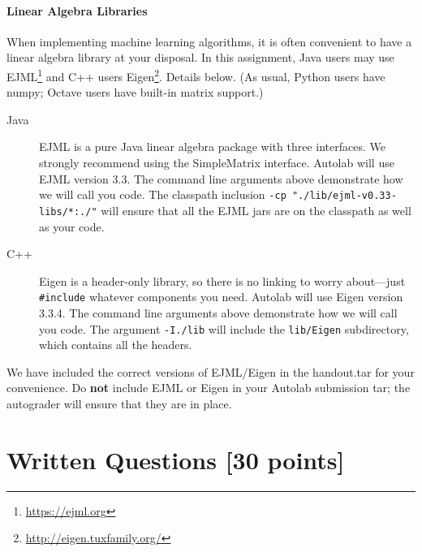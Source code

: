 \documentclass[11pt]{article}
\numberwithin{equation}{section} %
\numberwithin{figure}{section} %
\numberwithin{table}{section} %
\begin{document}
\begin{notebox}
\paragraph{Linear Algebra Libraries} When implementing machine learning algorithms, it is often convenient to have a linear algebra library at your disposal. In this assignment, Java users may use EJML\footnote{\url{https://ejml.org}} and C++ users Eigen\footnote{\url{http://eigen.tuxfamily.org/}}. Details below. 
%
(As usual, Python users have numpy; Octave users have built-in matrix support.)
%
\begin{description}
\item[Java] EJML is a pure Java linear algebra package with three interfaces. We strongly recommend using the SimpleMatrix interface. Autolab will use EJML version 3.3. The command line arguments above demonstrate how we will call you code. The classpath inclusion \lstinline{-cp "./lib/ejml-v0.33-libs/*:./"} will ensure that all the EJML jars are on the classpath as well as your code. 
\item[C++] Eigen is a header-only library, so there is no linking to worry about---just \lstinline{#include} whatever components you need. Autolab will use Eigen version 3.3.4. The command line arguments above demonstrate how we will call you code. The argument \lstinline{-I./lib} will include the \lstinline{lib/Eigen} subdirectory, which contains all the headers.
\end{description} 
We have included the correct versions of EJML/Eigen in the handout.tar for your convenience. Do {\bf not} include EJML or Eigen in your Autolab submission tar; the autograder will ensure that they are in place. 
\end{notebox}


\clearpage

\section{Written Questions [30 points]}
\label{sec:written}
\end{document}
